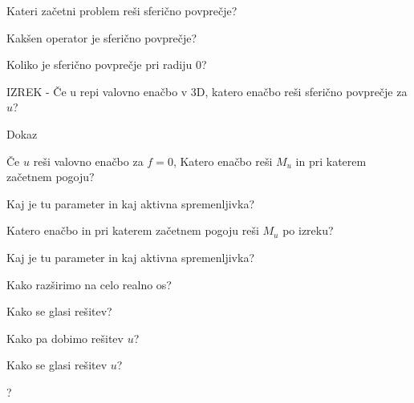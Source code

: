 \documentclass{article}
\begin{document}
\begin{enumerate}
        {\color{red}\item Kateri začetni problem reši sferično povprečje?}
        \item Kakšen operator je sferično povprečje?
        \item Koliko je sferično povprečje pri radiju 0?
        \item IZREK - Če u repi valovno enačbo v 3D, katero enačbo reši sferično povprečje za $u$?
        {\color{red}\item Dokaz}
        \item Če $u$ reši valovno enačbo za $f = 0$, Katero enačbo reši $M_u$ in pri katerem začetnem pogoju?
        \item Kaj je tu parameter in kaj aktivna spremenljivka?
        \item Katero enačbo in pri katerem začetnem pogoju reši $M_u$ po izreku?
        \item Kaj je tu parameter in kaj aktivna spremenljivka?
        \item Kako razširimo na celo realno os?
        {\color{red}\item Kako se glasi rešitev?}
        {\color{red}\item Kako pa dobimo rešitev $u$?}
        {\color{red}\item Kako se glasi rešitev $u$?}
        \item ?
    \end{enumerate}
\end{document}
